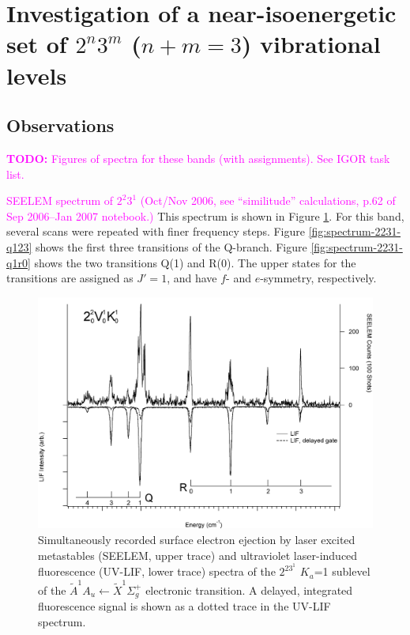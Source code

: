 \documentclass[12pt,draft]{mitthesis}
\newcommand{\TODO} [1]{\textcolor{magenta}{\textbf{TODO:} #1}}
\newcommand{\POINT}[1]{\textcolor{magenta}{#1}}
\begin{document}
\section{Investigation of a near-isoenergetic set of $2^n3^m$ ($n+m=3$)
  vibrational levels}

\subsection{Observations}

\TODO{Figures of spectra for these bands (with assignments). See IGOR
  task list.}

\POINT{SEELEM spectrum of $2^2 3^1$ (Oct/Nov 2006, see ``similitude''
  calculations, p.62 of Sep 2006--Jan 2007 notebook.)}  This spectrum
is shown in Figure \ref{fig:spectrum-2231}.  For this band, several
scans were repeated with finer frequency steps.  Figure
\ref{fig:spectrum-2231-q123} shows the first three transitions of the
Q-branch.  Figure \ref{fig:spectrum-2231-q1r0} shows the two
transitions Q(1) and R(0).  The upper states for the transitions are
assigned as $J'=1$, and have $f$- and $e$-symmetry, respectively.

\begin{figure}
  \caption{
    Simultaneously recorded surface electron ejection by laser excited
    metastables (SEELEM, upper trace) and ultraviolet laser-induced
    fluorescence (UV-LIF, lower trace) spectra of the $2^23^1$ $K_a$=1
    sublevel of the $\tilde{A}^1A_u \leftarrow \tilde{X} ^1\Sigma_g^+$
    electronic transition. A delayed, integrated fluorescence signal
    is shown as a dotted trace in the UV-LIF spectrum.}
  \label{fig:spectrum-2231}
  \centering
  \includegraphics[width=8in,angle=90]{spectrum-2231.png}
\end{figure}
\end{document}
